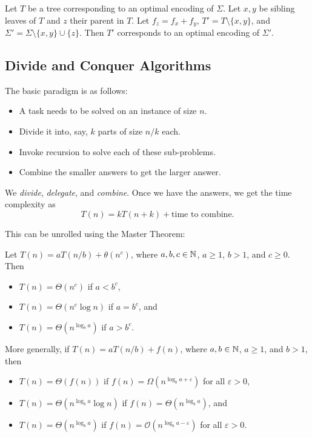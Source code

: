 \begin{lemma}
	Let $T$ be a tree corresponding to an optimal encoding of $\Sigma$. Let $x,y$ be sibling leaves of $T$ and $z$ their parent in $T$. Let $f_z=f_x+f_y$, $T'=T\setminus\{x,y\}$, and $\Sigma'=\Sigma\setminus\{x,y\}\cup\{z\}$. Then $T'$ corresponds to an optimal encoding of $\Sigma'$.
\end{lemma}

\subsection{Divide and Conquer Algorithms}


The basic paradigm is as follows:
\begin{itemize}
	\item A task needs to be solved on an instance of size $n$.
	\item Divide it into, say, $k$ parts of size $n/k$ each.
	\item Invoke recursion to solve each of these sub-problems.
	\item Combine the smaller answers to get the larger answer.
\end{itemize}

We \textit{divide}, \textit{delegate}, and \textit{combine}. Once we have the answers, we get the time complexity as
\[ T(n) = k T(n+k) + \text{time to combine}. \]

This can be unrolled using the Master Theorem:

\begin{theorem}
	Let $T(n)=a T(n/b) + \theta(n^c)$, where $a,b,c\in\mathbb{N}$, $a\geq 1$, $b>1$, and $c\geq 0$. Then
	\begin{itemize}
		\item $T(n)=\Theta(n^c)$ if $a<b^c$,
		\item $T(n)=\Theta(n^c\log n)$ if $a=b^c$, and
		\item $T(n)=\Theta(n^{\log_b a})$ if $a>b^c$.
	\end{itemize}
	More generally, if $T(n)=a T(n/b) + f(n)$, where $a,b\in\mathbb{N}$, $a\geq 1$, and $b>1$, then
	\begin{itemize}
		\item $T(n)=\Theta(f(n))$ if $f(n) = \Omega(n^{\log_b a + \varepsilon})$ for all $\varepsilon>0$,
		\item $T(n)=\Theta(n^{\log_b a}\log n)$ if $f(n) = \Theta(n^{\log_b a})$, and
		\item $T(n)=\Theta(n^{\log_b a})$ if $f(n) = \mathcal{O}(n^{\log_b a - \varepsilon})$ for all $\varepsilon>0$.
	\end{itemize}
\end{theorem}

